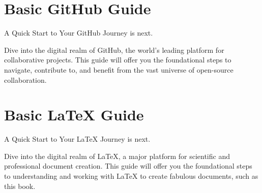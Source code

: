 \documentclass[a4paper,12pt]{book}
\begin{document}
\appendix
\chapter{Basic GitHub Guide}
A Quick Start to Your GitHub Journey is next.

Dive into the digital realm of GitHub, the world's leading platform for collaborative projects. This guide will offer you the foundational steps to navigate, contribute to, and benefit from the vast universe of open-source collaboration.

\chapter{Basic LaTeX Guide}
A Quick Start to Your LaTeX Journey is next.

Dive into the digital realm of LaTeX, a major platform for scientific and professional document creation. This guide will offer you the foundational steps to understanding and working with LaTeX to create fabulous documents, such as this book.



\printindex
\end{document}
